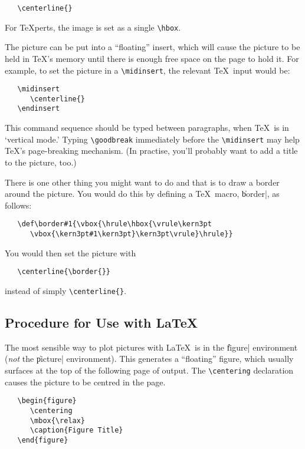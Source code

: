 \begin{verbatim}
   \centerline{}
\end{verbatim}

\noindent For \TeX{}perts, the image is set as a single \verb|\hbox|.
  
The picture can be put into a ``floating'' insert, which will cause the
picture to be held in \TeX's memory until there is enough free space on
the page to hold it. For example, to set the picture in a \verb"\midinsert",
the relevant \TeX\ input would be:

\begin{verbatim}
   \midinsert
      \centerline{}
   \endinsert
\end{verbatim}

\noindent This command sequence should be typed between paragraphs,
when \TeX\ is in `vertical mode.' Typing \verb"\goodbreak" immediately
before the \verb"\midinsert" may help \TeX's page-breaking mechanism. (In
practise, you'll probably want to add a title to the picture, too.)

There is one other thing you might want to do and that is to draw a border
around the picture. You would do this by defining a \TeX\ macro, \|border|,
as follows:

\begin{verbatim}
   \def\border#1{\vbox{\hrule\hbox{\vrule\kern3pt
      \vbox{\kern3pt#1\kern3pt}\kern3pt\vrule}\hrule}}
\end{verbatim}

\noindent You would then set the picture with

\begin{verbatim}
   \centerline{\border{}}
\end{verbatim}

\noindent instead of simply \verb"\centerline{}".

\subsection{Procedure for Use with \LaTeX}
The most sensible way to plot pictures with \LaTeX\ is in the \|figure|
environment ({\em not\/} the \|picture| environment). This generates
a ``floating'' figure, which usually surfaces at the top of the following
page of output. The \verb|\centering| declaration causes the picture to
be centred in the page.

\begin{verbatim}
   \begin{figure}
      \centering
      \mbox{\relax}
      \caption{Figure Title}
   \end{figure}
\end{verbatim}

